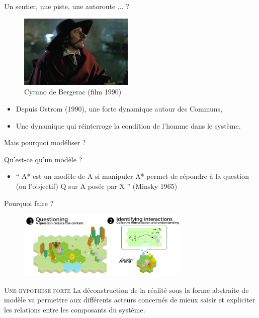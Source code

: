 \documentclass[newPxFont]{beamer}
\begin{document}
\begin{frame}[c]{Un sentier, une piste, une autoroute ... ?}
\vspace{-1cm}
\begin{figure}
  \includegraphics[height=3.5cm]{img/cyrano.jpg}
  \caption{Cyrano de Bergerac (film 1990)}
\end{figure}
\begin{itemize}
  \item Depuis Ostrom (1990), une forte dynamique autour des Communs,
  \item Une dynamique qui réinterroge la condition de l’homme dans le système.
\end{itemize}
\end{frame}

\begin{frame}[c]{Mais pourquoi modéliser ?}
\vspace{-1cm}

Qu'est-ce qu'un modèle ?
\begin{itemize}
  \item `` A* est un modèle de A si manipuler A* permet de répondre à la question (ou l'objectif) Q sur A posée par X '' (Minsky 1965)
\end{itemize}

Pourquoi faire ?
\vspace{-0.4cm}
\begin{figure}
  \includegraphics[height=3.2cm]{img/modeliser.png}
\end{figure}

\small{
  \begin{alertblock}{\textsc{Une hypothese forte}}
    La déconstruction de la réalité sous la forme abstraite de modèle va permettre aux différents acteurs concernés de mieux saisir et expliciter les relations entre les composants du système.
  \end{alertblock}
}
\end{frame}
\end{document}

